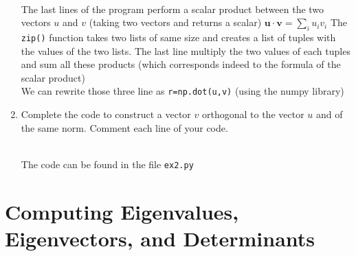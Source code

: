 \documentclass[a4paper]{article}
\begin{document}
\begin{enumerate}
    \hrulefill\\
    The last lines of the program perform a scalar product between the two vectors $u$ and $v$ (taking two vectors and returns a scalar) $\mathbf{u}\cdot \mathbf{v}=\displaystyle\sum_{i} u_{i}v_{i}$ The \texttt{zip()} function takes two lists of same size and creates a list of tuples with the values of the two lists. The last line multiply the two values of each tuples and sum all these products (which corresponds indeed to the formula of the scalar product)\\
    We can rewrite those three line as \texttt{r=np.dot(u,v)} (using the numpy library)\\


    \item Complete the code to construct a vector $v$ orthogonal to the vector $u$ and of the same norm.
    Comment each line of your code.
    
    \hrulefill\\
    The code can be found in the file \texttt{ex2.py}

\end{enumerate}

% 
% 
\clearpage
\section{Computing Eigenvalues, Eigenvectors, and Determinants}
\end{document}

